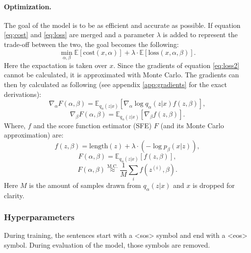 \documentclass[a4paper, 12pt]{report}
\newcommand{\approxtext}[1]{\ensuremath{\stackrel{\text{#1}}{\approx}}}
\begin{document}
\paragraph{Optimization.} 
The goal of the model is to be as efficient and accurate as possible. 
If equation \ref{eq:cost} and \ref{eq:loss} are merged and a parameter $\lambda$ is added to represent the trade-off between the two, the goal becomes the following:
\begin{equation}
    \label{eq:loss2}
    \min_{\alpha, \beta} \mathbb{E} [\text{cost}(x, \alpha)] + \lambda \cdot \mathbb{E}[\text{loss}(x, \alpha, \beta)].
\end{equation}
Here the expactation is taken over $x$. 
Since the gradients of equation \ref{eq:loss2} cannot be calculated, it is approximated with Monte Carlo.
The gradients can then by calculated as following (see appendix \ref{app:gradients} for the exact derivations):
\begin{equation}
    \label{eq:gradient_alpha}
    \nabla_\alpha F(\alpha, \beta) = \mathbb{E}_{q_{\alpha}(z|x)} [\nabla_{\alpha} \log q_{\alpha}(z|x) f(z, \beta)],
\end{equation}
\begin{equation}
    \label{eq:gradient_beta}
    \nabla_\beta F(\alpha, \beta) = \mathbb{E}_{q_{\alpha}(z|x)} [\nabla_{\beta} f (z, \beta)].
\end{equation}
Where, $f$ and the score function estimator (SFE) $F$ (and its Monte Carlo approximation) are:
\begin{equation}
    \label{eq:f}
    f(z, \beta) = \text{length}(z) + \lambda \cdot (-\log p_{\beta}(x|z)),
\end{equation}
\begin{equation}
    \label{eq:F}
    F (\alpha, \beta) = \mathbb{E}_{q_{\alpha}(z|x)} [f(z, \beta)],
\end{equation}
\begin{equation}
    \label{eq:F_approx}
    F (\alpha, \beta) \approxtext{M.C.} \frac{1}{M} \sum_i f (z^{(i)}, \beta).
\end{equation}
Here $M$ is the amount of samples drawn from $q_{\alpha}(z|x)$ and $x$ is dropped for clarity.

\subsubsection{Hyperparameters}
During training, the sentences start with a <sos> symbol and end with a <eos> symbol.
During evaluation of the model, those symbols are removed.
\end{document}
